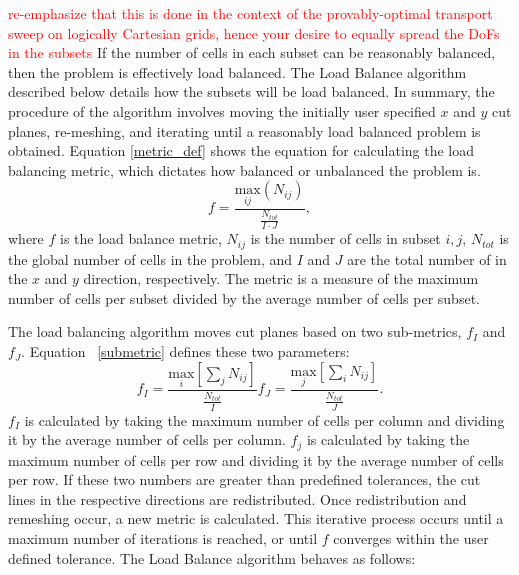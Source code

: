 \documentclass{anstrans}
\newcommand{\tcr}[1]{\textcolor{red}{#1}} %
\begin{document}
\tcr{re-emphasize that this is done in the context of the provably-optimal transport sweep on logically Cartesian grids, hence your desire to equally spread the DoFs in the subsets}
If the number of cells in each subset can be reasonably balanced, then the problem is effectively load balanced. The Load Balance algorithm described below details how the subsets will be load balanced. In summary, the procedure of the algorithm involves moving the initially user specified $x$ and $y$ cut planes, re-meshing, and iterating until a reasonably load balanced problem is obtained.  Equation \ref{metric_def} shows the equation for calculating the load balancing metric, which dictates how balanced or unbalanced the problem is.
\begin{equation}
f =\frac{\underset{ij}{\text{max}}(N_{ij})}{\frac{N_{tot}}{I\cdot J}},
\label{metric_def}
\end{equation}
where $f$ is the load balance metric, $N_{ij}$ is the number of cells in subset $i,j$, $N_{tot}$ is the global number of cells in the problem, and $I$ and $J$ are the total number of in the $x$ and $y$ direction, respectively. The metric is a measure of the maximum number of cells per subset divided by the average number of cells per subset.

The load balancing algorithm moves cut planes based on two sub-metrics, $f_I$ and $f_J$. Equation ~\eqref{submetric} defines these two parameters:
\begin{subequations}
\label{submetric}
\begin{equation}
f_I = \frac{ \underset{i}{\text{max}}[\sum_{j} N_{ij}] } {\frac{N_{tot}}{I}} 
\end{equation}
\begin{equation}
f_J = \frac{\underset{j}{\text{max}}[\sum_{i} N_{ij}] } {\frac{N_{tot}}{J}}.
\end{equation}
\end{subequations}
%
$f_I$ is calculated by taking the maximum number of cells per column and dividing it by the average number of cells per column. $f_j$ is calculated by taking the maximum number of cells per row and dividing it by the average number of cells per row. If these two numbers are greater than predefined tolerances, the cut lines in the respective directions are redistributed. Once redistribution and remeshing occur, a new metric is calculated. This iterative process occurs until a maximum number of iterations is reached, or until $f$ converges within the user defined tolerance. The Load Balance algorithm behaves as follows:
\end{document}
